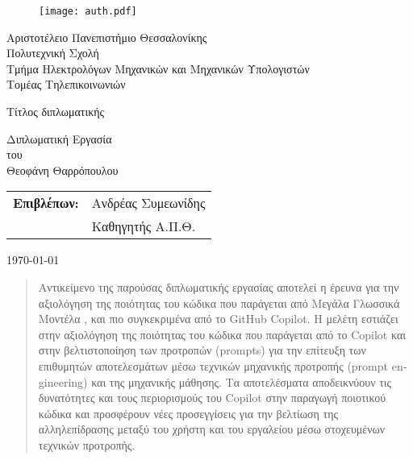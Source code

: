 \begin{titlepage}

  \begin{figure}[H]
    \begin{center}
      \texttt{[image: auth.pdf]}
      \label{fig:cover_auth_logo}
    \end{center}
  \end{figure}

  \centering \Large Αριστοτέλειο Πανεπιστήμιο Θεσσαλονίκης\\ \Large
  Πολυτεχνική Σχολή\\ \large Τμήμα Ηλεκτρολόγων Μηχανικών και Μηχανικών
  Υπολογιστών\\ \large Τομέας Τηλεπικοινωνιών

  \vspace{
    \fill}

  \LARGE Τίτλος διπλωματικής

  \vspace{
    \fill}

  \Large Διπλωματική Εργασία\\ \Large του\\ \Large Θεοφάνη Θαρρόπουλου

  \vspace{
    \fill} \raggedright

  \begin{tabular}{ll}
    \textbf{Επιβλέπων:} & Ανδρέας Συμεωνίδης \\
    & Καθηγητής Α.Π.Θ.\\
  \end{tabular}

  \centering \vspace{
    \fill} \today

\end{titlepage}

\begin{abstract}
  Αντικείμενο της παρούσας διπλωματικής εργασίας αποτελεί η έρευνα για
  την αξιολόγηση της ποιότητας του κώδικα που παράγεται από Μεγάλα
  Γλωσσικά Μοντέλα , και πιο συγκεκριμένα από το
  \textlatin{GitHub Copilot}\cite{githubcopilot}. Η μελέτη εστιάζει στην
  αξιολόγηση της ποιότητας του κώδικα που παράγεται από το Copilot και
  στην βελτιστοποίηση των προτροπών \textlatin{(prompts)} για την
  επίτευξη των επιθυμητών αποτελεσμάτων μέσω τεχνικών μηχανικής
  προτροπής \textlatin{(prompt engineering)} και της μηχανικής μάθησης.
  Τα αποτελέσματα αποδεικνύουν τις δυνατότητες και τους περιορισμούς του
  Copilot στην παραγωγή ποιοτικού κώδικα και προσφέρουν νέες
  προσεγγίσεις για την βελτίωση της αλληλεπίδρασης μεταξύ του χρήστη και
  του εργαλείου μέσω στοχευμένων τεχνικών προτροπής.
\end{abstract}

